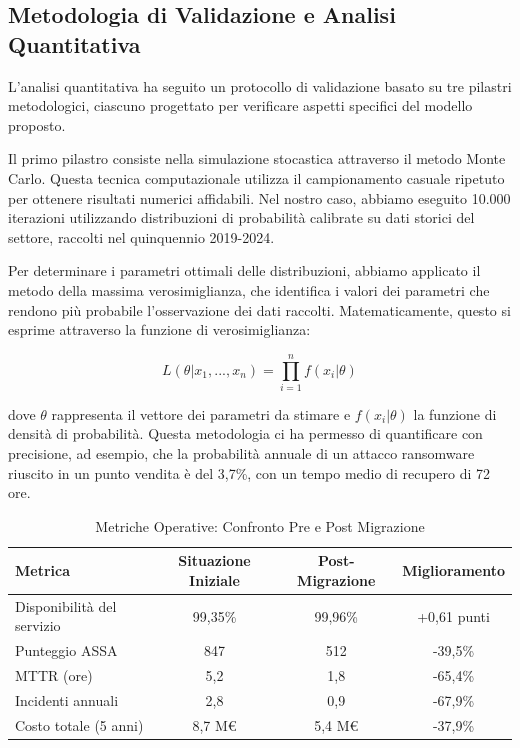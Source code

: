 \subsection{Metodologia di Validazione e Analisi Quantitativa}
\label{subsec:5.2.2}

L'analisi quantitativa ha seguito un protocollo di validazione basato su tre pilastri metodologici, ciascuno progettato per verificare aspetti specifici del modello proposto.

Il primo pilastro consiste nella simulazione stocastica attraverso il metodo Monte Carlo. Questa tecnica computazionale utilizza il campionamento casuale ripetuto per ottenere risultati numerici affidabili. Nel nostro caso, abbiamo eseguito 10.000 iterazioni utilizzando distribuzioni di probabilità calibrate su dati storici del settore, raccolti nel quinquennio 2019-2024. 

Per determinare i parametri ottimali delle distribuzioni, abbiamo applicato il metodo della massima verosimiglianza, che identifica i valori dei parametri che rendono più probabile l'osservazione dei dati raccolti. Matematicamente, questo si esprime attraverso la funzione di verosimiglianza:

\begin{equation}
L(\theta|x_1,...,x_n) = \prod_{i=1}^{n} f(x_i|\theta)
\end{equation}

dove $\theta$ rappresenta il vettore dei parametri da stimare e $f(x_i|\theta)$ la funzione di densità di probabilità. Questa metodologia ci ha permesso di quantificare con precisione, ad esempio, che la probabilità annuale di un attacco ransomware riuscito in un punto vendita è del 3,7\%, con un tempo medio di recupero di 72 ore.

\begin{table}[h!]
\centering
\caption{Metriche Operative: Confronto Pre e Post Migrazione}
\label{tab:operational_metrics}
\begin{tabular}{|l|c|c|c|}
\hline
\textbf{Metrica} & \textbf{Situazione Iniziale} & \textbf{Post-Migrazione} & \textbf{Miglioramento} \\
\hline
Disponibilità del servizio & 99,35\% & 99,96\% & +0,61 punti \\
Punteggio ASSA & 847 & 512 & -39,5\% \\
MTTR (ore) & 5,2 & 1,8 & -65,4\% \\
Incidenti annuali & 2,8 & 0,9 & -67,9\% \\
Costo totale (5 anni) & 8,7 M€ & 5,4 M€ & -37,9\% \\
\hline
\end{tabular}
\end{table}

